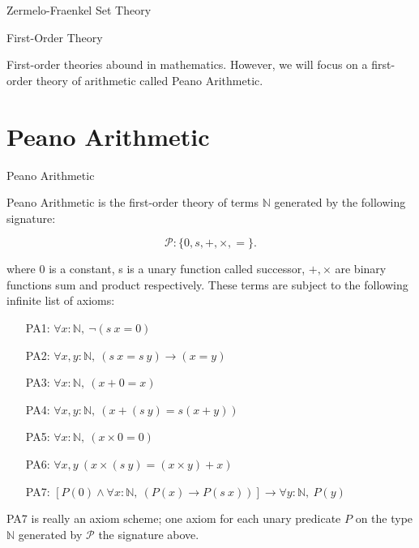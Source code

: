 \documentclass{book}
\begin{document}
    \begin{eg}{Zermelo-Fraenkel Set Theory}


    \end{eg}

    \begin{definition}{First-Order Theory}

    \end{definition}

    First-order theories abound in mathematics. However, we will focus on a first-order theory of arithmetic called Peano Arithmetic. 

    \newpage
    \section{Peano Arithmetic}

    \begin{definition}{Peano Arithmetic}

        Peano Arithmetic is the first-order theory of terms $\mathbb{N}$ generated by the following signature:

        $$\mathcal{P} : \{0, s, +, \times, =\}.$$

        where 0 is a constant, s is a unary function called successor, $+, \times$ are binary functions sum and product respectively. These terms are subject to the following infinite list of axioms:

        \vspace{0.2cm}

        \begin{enumerate}
            \item[PA1: ] $\forall x : \mathbb{N}, \ \lnot(s \ x = 0)$
            \item[PA2: ] $\forall x,y : \mathbb{N}, \ (s \ x = s \ y) \to (x = y)$		\item[PA3: ] $\forall x : \mathbb{N}, \ (x + 0 = x)$
            \item[PA4: ] $\forall x,y : \mathbb{N}, \ (x + (s \ y) = s(x + y))$
            \item[PA5: ] $\forall x : \mathbb{N}, \ (x \times 0 = 0)$
            \item[PA6: ] $\forall x,y \ (x \times (s \ y) = (x \times y) + x)$
            \item[PA7: ] $[P(0) \land \forall x : \mathbb{N}, \ (P(x) \to P(s \ x))] \rightarrow \forall y : \mathbb{N}, \ P(y)$
        \end{enumerate}

        \vspace{0.2cm}

        PA7 is really an axiom scheme; one axiom for each unary predicate $P$ on the type $\mathbb{N}$ generated by $\mathcal{P}$ the signature above. 

    \end{definition}
\end{document}
